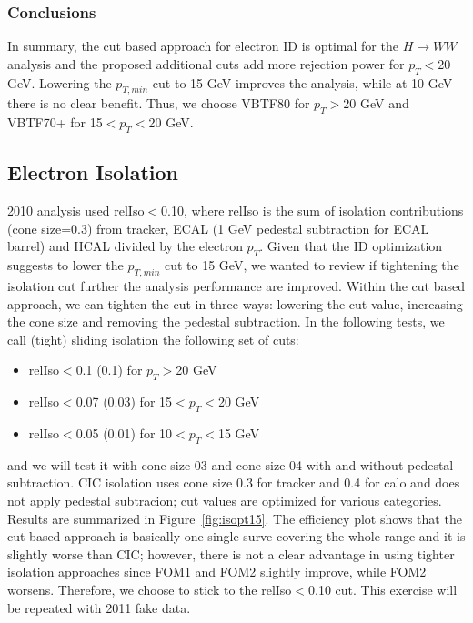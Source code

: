 \subsubsection{Conclusions}

In summary, the cut based approach for electron ID is optimal for the $H\rightarrow WW$ analysis and the proposed additional cuts add more rejection power 
for $p_T<$20 GeV. Lowering the $p_{T,min}$ cut to 15 GeV improves the analysis, while at 10 GeV there is no clear benefit. 
Thus, we choose VBTF80 for $p_T>$20 GeV and VBTF70+ for 15$<p_T<$20 GeV.

\subsection{Electron Isolation}

2010 analysis used relIso$<$0.10, where relIso is the sum of isolation contributions (cone size=0.3) from tracker, ECAL (1 GeV pedestal subtraction for ECAL barrel)
and HCAL divided by the electron $p_T$.
Given that the ID optimization suggests to lower the  $p_{T,min}$ cut to 15 GeV, we wanted to review if tightening the isolation cut further 
the analysis performance are improved.
Within the cut based approach, we can tighten the cut in three ways: lowering the cut value, increasing the cone size and removing the pedestal subtraction.
In the following tests, we call (tight) sliding isolation the following set of cuts: 
\begin{itemize}
\item relIso$<$0.1 (0.1) for $p_T>$20 GeV
\item relIso$<$0.07 (0.03) for 15$<p_T<$20 GeV
\item relIso$<$0.05 (0.01) for 10$<p_T<$15 GeV
\end{itemize}
and we will test it with cone size 03 and cone size 04 with and without pedestal subtraction.
CIC isolation uses cone size 0.3 for tracker and 0.4 for calo and does not apply pedestal subtracion; cut values are optimized for various categories.
Results are summarized in Figure~\ref{fig:isopt15}. 
The efficiency plot shows that the cut based approach is basically one single surve covering the whole range and it is slightly worse than CIC; 
however, there is not a clear advantage in using tighter isolation approaches since FOM1 and FOM2 slightly improve, while FOM2 worsens. 
Therefore, we choose to stick to the relIso$<$0.10 cut. This exercise will be repeated with 2011 fake data.

